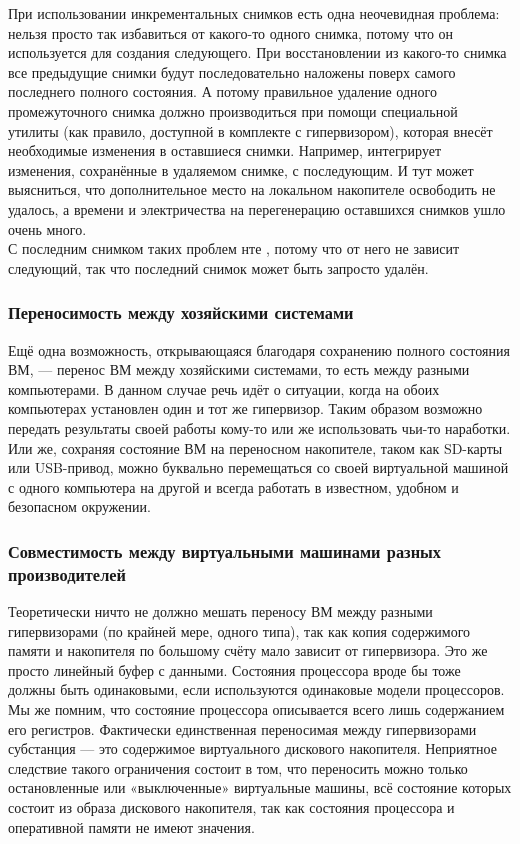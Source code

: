 \documentclass[14pt, a4paper]{article}
\begin{document}
При использовании инкрементальных снимков есть одна неочевидная проблема: нельзя просто так
избавиться от какого-то одного снимка, потому что он используется для создания следующего. При
восстановлении из какого-то снимка все предыдущие снимки будут последовательно наложены
поверх самого последнего полного состояния. А потому правильное удаление одного промежуточного
снимка должно производиться при помощи специальной утилиты (как правило, доступной в комплекте
с гипервизором), которая внесёт необходимые изменения в оставшиеся снимки. Например,
интегрирует изменения, сохранённые в удаляемом снимке, с последующим. И тут может выясниться,
что дополнительное место на локальном накопителе освободить не удалось, а времени и
электричества на перегенерацию оставшихся снимков ушло очень много.\\

С последним снимком таких проблем нте , потому что от него не зависит следующий, так что
последний снимок может быть запросто удалён.

\subsubsection*{Переносимость между хозяйскими системами}

Ещё одна возможность, открывающаяся благодаря сохранению полного состояния ВМ, — перенос ВМ
между хозяйскими системами, то есть между разными компьютерами. В данном случае речь идёт о
ситуации, когда на обоих компьютерах установлен один и тот же гипервизор. Таким образом возможно
передать результаты своей работы кому-то или же использовать чьи-то наработки. Или же, сохраняя
состояние ВМ на переносном накопителе, таком как SD-карты или USB-привод, можно буквально
перемещаться со своей виртуальной машиной с одного компьютера на другой и всегда работать в
известном, удобном и безопасном окружении.

\subsubsection*{Совместимость между виртуальными машинами разных
производителей}

Теоретически ничто не должно мешать переносу ВМ между разными гипервизорами (по крайней мере,
одного типа), так как копия содержимого памяти и накопителя по большому счёту мало зависит от
гипервизора. Это же просто линейный буфер с данными. Состояния процессора вроде бы тоже
должны быть одинаковыми, если используются одинаковые модели процессоров. Мы же помним, что
состояние процессора описывается всего лишь содержанием его регистров. Фактически единственная
переносимая между гипервизорами субстанция — это содержимое виртуального дискового
накопителя. Неприятное следствие такого ограничения состоит в том, что переносить можно только
остановленные или «выключенные» виртуальные машины, всё состояние которых состоит из образа
дискового накопителя, так как состояния процессора и оперативной памяти не имеют значения.\\
\end{document}
